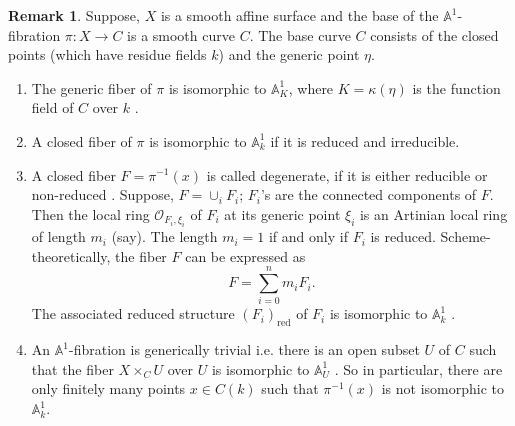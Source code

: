 \documentclass[11pt, reqno]{amsart}
\theoremstyle{plain}
\theoremstyle{definition}
\newtheorem{remark}[thm]{Remark}
\begin{document}
	\begin{remark} \label{properties a1 fibration}
Suppose, $X$ is a smooth affine surface and the base of the $\mathbb{A}^1$-fibration $\pi: X \to C$ is a smooth curve $C$. The base curve $C$ consists of the closed points (which have residue fields $k$) and the generic point $\eta$. 
    \begin{enumerate}
        \item The generic fiber of $\pi$ is isomorphic to $\mathbb{A}^1_K$, where $K=\kappa(\eta)$ is the function field of $C$ over $k$ \cite[Section 2.2]{kambayashi}.
        \item A closed fiber of $\pi$ is isomorphic to $\mathbb{A}^1_k$ if it is reduced and irreducible. 
        \item A closed fiber $F=\pi^{-1}(x)$ is called degenerate, if it is either reducible or non-reduced \cite[Definition 4]{doub}. Suppose,
        $F = \cup_{i} F_i$; $F_i$'s are the connected components of $F$. Then the local ring $\mathcal{O}_{F_i, \xi_i}$ of $F_i$ at its generic point $\xi_i$ is an Artinian local ring of length $m_i$ (say). The length $m_i =1$ if and only if $F_i$ is reduced. Scheme-theoretically, the fiber $F$ can be expressed as $$F=\sum_{i=0}^n m_i F_i.$$
        The associated reduced structure $(F_i)_{\text{red}}$ of $F_i$ is isomorphic to $\mathbb{A}^1_k$
        \cite[Chapter 3, Lemma 1.4.2]{miyanishicrm}.
   \item An $\mathbb{A}^1$-fibration is generically trivial i.e. there is an open subset $U$ of $C$ such that the fiber $X \times_C U$ over $U$ is isomorphic to $\mathbb{A}^1_U$ \cite[Lemma 1.1]{threefolds}. So in particular, there are only finitely many points $x \in C(k)$ such that $\pi^{-1}(x)$ is not isomorphic to $\mathbb{A}^1_k$. 
   \end{enumerate}
	\end{remark}
	
\end{document}
